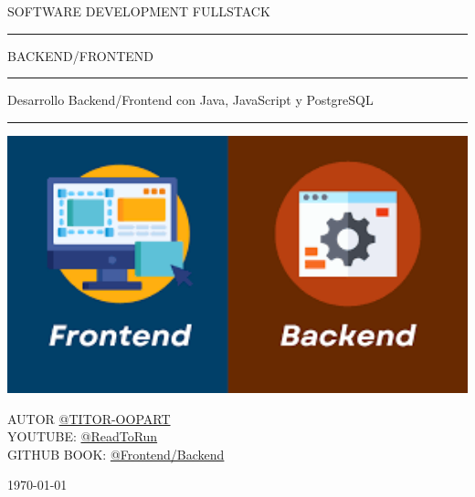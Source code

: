 \begin{titlepage}
	\noindent
	\centering
	\Large {SOFTWARE DEVELOPMENT FULLSTACK}
	\begin{center}
		\centering
		\rule{150 mm}{0.1 mm}
		\Large {BACKEND/FRONTEND\\}
		
		\rule{150 mm}{0.1 mm}
		\large {{Desarrollo Backend/Frontend con Java, JavaScript y PostgreSQL}}
		\rule{150 mm}{0.4 mm}
		\vspace{1 cm}
		\vspace{0.3 cm}
		\includegraphics[width=1\textwidth]{image/cover.png}
	\end{center}
	\vspace{0.3 cm}
	\begin{center}
		{\large AUTOR
			{\href{https://github.com/titoroopart/}{@TITOR-OOPART}}}	\\
		{\large YOUTUBE:	{\href{https://www.youtube.com/@ReadToRun}{@ReadToRun}}}	\\
		{\large GITHUB BOOK:  	{\href{https://github.com/titoroopart/Backend_Frontend#}{@Frontend/Backend}}}\\
	\end{center}
	\vspace{0.5 cm}
	\vfill
	\begin{center}
		\large\today
	\end{center}
\end{titlepage}
